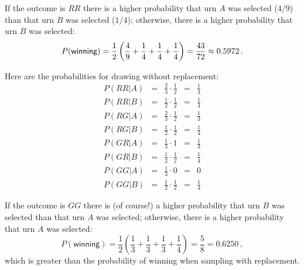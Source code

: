 If the outcome is $RR$ there is a higher probability that urn $A$ was selected ($4/9$) than that urn $B$ was selected ($1/4$); otherwise, there is a higher probability that urn $B$ was selected:
\[
P(\textsf{winning})=\frac{1}{2}\left(\frac{4}{9} + \frac{1}{4}+ \frac{1}{4}+ \frac{1}{4}\right)=\displaystyle\frac{43}{72}\approx 0.5972\,.
\]

 Here are the probabilities for drawing without replacement:
\[
\renewcommand*{\arraystretch}{1.5}
\begin{array}{lcccc}
P(RR|A) &=& \frac{2}{3} \cdot \frac{1}{2} &=& \frac{1}{3}\\
P(RR|B) &=& \frac{1}{2} \cdot \frac{1}{2} &=& \frac{1}{4}\\
\hline
P(RG|A) &=& \frac{2}{3} \cdot \frac{1}{2} &=& \frac{1}{3}\\
P(RG|B) &=& \frac{1}{2} \cdot \frac{1}{2} &=& \frac{1}{4}\\
\hline
P(GR|A) &=& \frac{1}{3} \cdot 1 &=& \frac{1}{3}\\
P(GR|B) &=& \frac{1}{2} \cdot \frac{1}{2} &=& \frac{1}{4}\\
\hline
P(GG|A) &=& \frac{1}{3} \cdot 0 &=& 0\\
P(GG|B) &=& \frac{1}{2} \cdot \frac{1}{2} &=& \frac{1}{4}
\end{array}
\]

If the outcome is $GG$ there is (of course!) a higher probability that urn $B$ was selected than that urn $A$ was selected; otherwise, there is a higher probability that urn $A$ was selected:
\[
P(\textsf{winning})=\frac{1}{2}\left(\frac{1}{3} + \frac{1}{3}+ \frac{1}{3}+ \frac{1}{4}\right)=\frac{5}{8}=0.6250\,,
\]
which is greater than the probability of winning when sampling with replacement.

